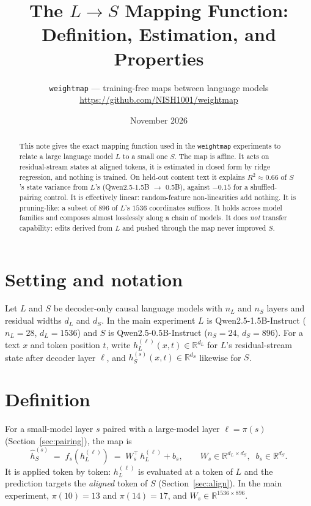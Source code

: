 \documentclass[10pt]{article}
\title{The $L \to S$ Mapping Function:\\Definition, Estimation, and Properties}
\author{\texttt{weightmap} --- training-free maps between language models\\
\small\url{https://github.com/NISH1001/weightmap}}
\date{November 2026}
\newcommand{\R}{\mathbb{R}}
\newcommand{\hL}{h_L^{(\ell)}}
\begin{document}
\maketitle

\begin{abstract}
This note gives the exact mapping function used in the \texttt{weightmap} experiments to relate a large
language model $L$ to a small one $S$. The map is affine. It acts on residual-stream states at aligned
tokens, it is estimated in closed form by ridge regression, and nothing is trained. On held-out content
text it explains $R^2 \approx 0.66$ of $S$'s state variance from $L$'s (Qwen2.5-1.5B $\to$ 0.5B), against
$-0.15$ for a shuffled-pairing control. It is effectively linear: random-feature non-linearities add
nothing. It is pruning-like: a subset of $896$ of $L$'s $1536$ coordinates suffices. It holds across model
families and composes almost losslessly along a chain of models. It does \emph{not} transfer capability:
edits derived from $L$ and pushed through the map never improved $S$.
\end{abstract}

\section{Setting and notation}
Let $L$ and $S$ be decoder-only causal language models with $n_L$ and $n_S$ layers and residual widths
$d_L$ and $d_S$. In the main experiment $L$ is Qwen2.5-1.5B-Instruct ($n_L=28$, $d_L=1536$) and $S$ is
Qwen2.5-0.5B-Instruct ($n_S=24$, $d_S=896$). For a text $x$ and token position $t$, write
$h_L^{(\ell)}(x,t)\in\R^{d_L}$ for $L$'s residual-stream state after decoder layer $\ell$, and
$h_S^{(s)}(x,t)\in\R^{d_S}$ likewise for $S$.

\section{Definition}
For a small-model layer $s$ paired with a large-model layer $\ell = \pi(s)$ (Section~\ref{sec:pairing}),
the map is
\begin{equation}
\boxed{\;\hat h_S^{(s)} \;=\; f_s\!\left(\hL\right) \;=\; W_s^{\top}\,\hL + b_s, \qquad
W_s \in \R^{d_L \times d_S},\;\; b_s \in \R^{d_S}.\;}
\label{eq:f}
\end{equation}
It is applied token by token: $\hL$ is evaluated at a token of $L$ and the prediction targets the
\emph{aligned} token of $S$ (Section~\ref{sec:align}). In the main experiment, $\pi(10)=13$ and
$\pi(14)=17$, and $W_s \in \R^{1536\times 896}$.
\end{document}
